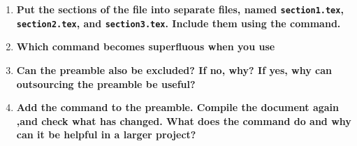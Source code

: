 \begin{enumerate}
  \item \textbf{Put the sections of the file into separate files, named 
  \texttt{section1.tex}, \texttt{section2.tex}, and \texttt{section3.tex}. 
  Include them using the  \texttt{} command.}
  \item \textbf{Which command becomes superfluous when you use 
  \texttt{}}
  \item \textbf{Can the preamble also be excluded? If no, why? If yes, why can 
  outsourcing the preamble be useful?}
  \item \textbf{Add the command \texttt{} to 
  the 
  preamble. Compile the document again ,and check what has changed. What does 
  the command do and why can it be helpful in a larger project? }
\end{enumerate}
